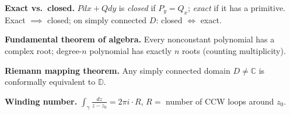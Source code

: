 \documentclass[9pt,twocolumn]{extarticle}
\begin{document}
\textbf{Exact vs.\ closed.} $Pdx+Qdy$ is \textit{closed} if $P_y=Q_x$; \textit{exact} if it has a primitive.
Exact $\implies$ closed;\; on simply connected $D$: closed $\iff$ exact.

\textbf{Fundamental theorem of algebra.} Every nonconstant polynomial has a complex root;\;
degree-$n$ polynomial has exactly $n$ roots (counting multiplicity).

\textbf{Riemann mapping theorem.} Any simply connected domain $D\ne\mathbb{C}$ is conformally equivalent to $\mathbb{D}$.

\textbf{Winding number.} $\displaystyle\int_\gamma\frac{dz}{z-z_0}=2\pi i\cdot R$,\; $R=$ number of CCW loops around $z_0$.
\end{document}
